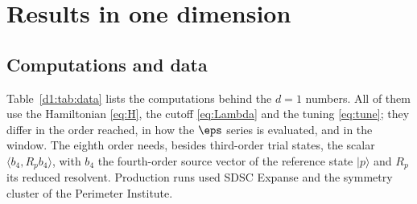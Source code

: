 \section{Results in one dimension}\label{d1:sec}

\subsection{Computations and data}\label{d1:sec:data}
Table~\ref{d1:tab:data} lists the computations behind the $d=1$ numbers. All of them use the Hamiltonian
\eqref{eq:H}, the cutoff \eqref{eq:Lambda} and the tuning \eqref{eq:tune}; they differ in the order reached, in how the
$\eps$ series is evaluated, and in the window. The eighth order needs, besides third-order trial states, the scalar
$\langle b_4,R_pb_4\rangle$, with $b_4$ the fourth-order source vector of the reference state $|p\rangle$ and $R_p$ its
reduced resolvent. Production runs used SDSC Expanse and the symmetry cluster of the Perimeter Institute.


